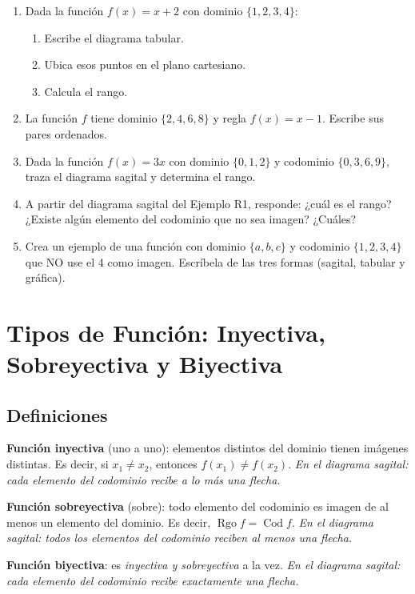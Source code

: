 \documentclass[12pt, letterpaper]{article}
\begin{document}
\begin{enumerate}[leftmargin=*, resume]
  \item \facil{} Dada la función $f(x) = x + 2$ con dominio $\{1, 2, 3, 4\}$:
        \begin{enumerate}[label=\alph*)]
          \item Escribe el diagrama tabular.
          \item Ubica esos puntos en el plano cartesiano.
          \item Calcula el rango.
        \end{enumerate}

  \item \facil{} La función $f$ tiene dominio $\{2, 4, 6, 8\}$ y regla $f(x) = x - 1$. Escribe sus pares ordenados.

  \item \medio{} Dada la función $f(x) = 3x$ con dominio $\{0, 1, 2\}$ y codominio $\{0, 3, 6, 9\}$, traza el diagrama sagital y determina el rango.

  \item \medio{} A partir del diagrama sagital del Ejemplo R1, responde: ¿cuál es el rango? ¿Existe algún elemento del codominio que no sea imagen? ¿Cuáles?

  \item \dificil{} Crea un ejemplo de una función con dominio $\{a, b, c\}$ y codominio $\{1, 2, 3, 4\}$ que NO use el 4 como imagen. Escríbela de las tres formas (sagital, tabular y gráfica).
\end{enumerate}


\section{Tipos de Función: Inyectiva, Sobreyectiva y Biyectiva}

\subsection{Definiciones}

\begin{cuadroteoria}
  \textbf{Función inyectiva} (uno a uno): elementos distintos del dominio tienen imágenes distintas. Es decir, si $x_1 \neq x_2$, entonces $f(x_1) \neq f(x_2)$. \emph{En el diagrama sagital: cada elemento del codominio recibe a lo más una flecha.}

  \textbf{Función sobreyectiva} (sobre): todo elemento del codominio es imagen de al menos un elemento del dominio. Es decir, $\operatorname{Rgo} f = \operatorname{Cod} f$. \emph{En el diagrama sagital: todos los elementos del codominio reciben al menos una flecha.}

  \textbf{Función biyectiva}: es \emph{inyectiva y sobreyectiva} a la vez. \emph{En el diagrama sagital: cada elemento del codominio recibe exactamente una flecha.}
\end{cuadroteoria}
\end{document}
